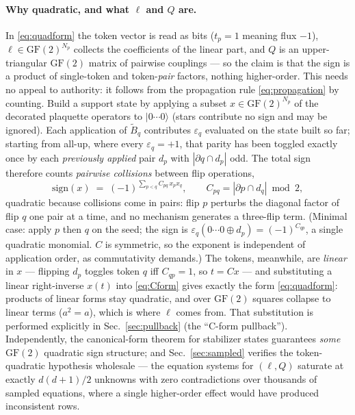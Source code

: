 \documentclass[11pt]{article}
\newcommand{\ket}[1]{|#1\rangle}
\newcommand{\GF}{\mathrm{GF}(2)}
\begin{document}
\paragraph{Why quadratic, and what $\ell$ and $Q$ are.}
In \eqref{eq:quadform} the token vector is read as bits ($t_p=1$ meaning
flux $-1$), $\ell\in\GF^{N_p}$ collects the coefficients of the linear part,
and $Q$ is an upper-triangular $\GF$ matrix of pairwise couplings --- so the
claim is that the sign is a product of single-token and token-\emph{pair}
factors, nothing higher-order. This needs no appeal to authority: it follows
from the propagation rule \eqref{eq:propagation} by counting. Build a
support state by applying a subset $x\in\GF^{N_p}$ of the decorated
plaquette operators to $\ket{0\cdots0}$ (stars contribute no sign and may be
ignored). Each application of $\tilde B_q$ contributes $\varepsilon_q$ evaluated
on the state built so far; starting from all-up, where every
$\varepsilon_q=+1$, that parity has been toggled exactly once by each
\emph{previously applied} pair $d_p$ with $|\partial q\cap d_p|$ odd. The
total sign therefore counts \emph{pairwise collisions} between flip
operations,
\begin{equation}
\mathrm{sign}(x) \;=\; (-1)^{\sum_{p<q} C_{pq}\,x_p x_q},
\qquad C_{pq} = |\partial p \cap d_q| \bmod 2 ,
\label{eq:Cform}
\end{equation}
quadratic because collisions come in pairs: flip $p$ perturbs the diagonal
factor of flip $q$ one pair at a time, and no mechanism generates a
three-flip term. (Minimal case: apply $p$ then $q$ on the seed; the sign is
$\varepsilon_q(0\cdots0\oplus d_p)=(-1)^{C_{qp}}$, a single quadratic
monomial. $C$ is symmetric, so the exponent is independent of application
order, as commutativity demands.) The tokens, meanwhile, are \emph{linear}
in $x$ --- flipping $d_p$ toggles token $q$ iff $C_{qp}=1$, so $t=Cx$ --- and
substituting a linear right-inverse $x(t)$ into \eqref{eq:Cform} gives
exactly the form \eqref{eq:quadform}: products of linear forms stay
quadratic, and over $\GF$ squares collapse to linear terms ($a^2=a$), which
is where $\ell$ comes from. That substitution is performed explicitly in
Sec.~\ref{sec:pullback} (the ``C-form pullback''). Independently, the
canonical-form theorem for stabilizer states \cite{DehaeneDeMoor2003}
guarantees \emph{some} $\GF$ quadratic sign structure; and
Sec.~\ref{sec:sampled} verifies the token-quadratic hypothesis wholesale ---
the equation systems for $(\ell,Q)$ saturate at exactly $d(d+1)/2$ unknowns
with zero contradictions over thousands of sampled equations, where a single
higher-order effect would have produced inconsistent rows.
\end{document}
